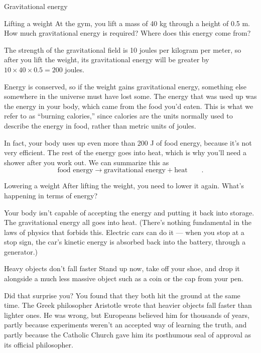 \begin{envsubsection}{Gravitational energy}
\begin{eg}{Lifting a weight}
\egquestion At the gym, you lift a mass of 40 kg through a height of 0.5 m. How much gravitational
energy is required? Where does this energy come from?

\eganswer 
The strength of the gravitational field is 10 joules per kilogram per meter, so after you lift the weight,
its gravitational energy will be greater by $10\times40\times0.5=200$ joules.

Energy is conserved, so
if the weight gains gravitational energy, something else somewhere in the universe must have lost some.
The energy that was used up was the energy in your body, which came from the food you'd eaten. This is what we refer to
as ``burning calories,'' since calories are the units normally used to describe the energy in food,
rather than metric units of joules.

In fact, your body uses up even more than 200 J of food energy, because it's not very efficient. The rest
of the energy goes into heat, which is why you'll need a shower after you work out. We can summarize this
as
\begin{equation*}
\text{food energy} \rightarrow \text{gravitational energy} + \text{heat} \qquad .
\end{equation*}
\end{eg}


\begin{eg}{Lowering a weight}
\egquestion After lifting the weight, you need to lower it again. What's happening in terms of energy?

\eganswer 
Your body isn't capable of accepting the energy and putting it back into storage. The gravitational
energy all goes into heat. (There's nothing
fundamental in the laws of physics that forbids this.
Electric cars can do it --- when you stop at a stop sign, the car's kinetic energy is absorbed
back into the battery, through a generator.) 
\end{eg}


\begin{eg}{Heavy objects don't fall faster}
Stand up now, take off your shoe, and drop it alongside a much less massive object
such as a coin or the cap from your pen.

Did that surprise you? You found that they both hit the ground at the same time.
The Greek philosopher Aristotle wrote that heavier objects fall faster than
lighter
ones. He was wrong, but Europeans believed him for thousands of years, partly because
experiments weren't an accepted way of learning the truth, and partly because the
Catholic Church gave him its posthumous seal of approval as its official
philosopher.


\end{eg}
\end{envsubsection}
